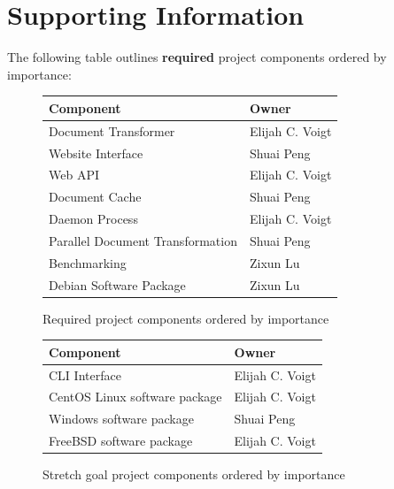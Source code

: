 \section{Supporting Information}


The following table outlines \textbf{required} project components ordered by importance:

\begin{figure}
\begin{center}
    \begin{tabular}{ | l | l | }
    \hline
      Component & Owner \\ \hline
      Document Transformer & Elijah C. Voigt \\ \hline
      Website Interface & Shuai Peng \\ \hline
      Web API & Elijah C. Voigt \\ \hline
      Document Cache & Shuai Peng \\ \hline
      Daemon Process & Elijah C. Voigt \\ \hline
      Parallel Document Transformation & Shuai Peng\\ \hline
      Benchmarking & Zixun Lu \\ \hline
      Debian Software Package & Zixun Lu \\ \hline
    \end{tabular}
\end{center}
\caption{Required project components ordered by importance}
\end{figure}

\begin{figure}
\begin{center}
    \begin{tabular}{ | l | l | }
    \hline
      Component & Owner \\ \hline
      CLI Interface & Elijah C. Voigt \\ \hline
      CentOS Linux software package & Elijah C. Voigt \\ \hline
      Windows software package & Shuai Peng \\ \hline
      FreeBSD software package & Elijah C. Voigt  \\ \hline
    \end{tabular}
\end{center}
\caption{Stretch goal project components ordered by importance}
\end{figure}

